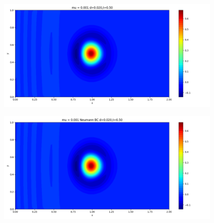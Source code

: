 \documentclass[12pt]{article}
\begin{document}
\begin{figure}[H]
\begin{minipage}{\linewidth}
    \begin{minipage}{0.5\textwidth}
    \includegraphics[width=\linewidth]{figuresmu/mu3d0.020t0.50.png}
    \label{fig3}
    \end{minipage}\hfill
    \begin{minipage}{0.5\textwidth}
    \includegraphics[width=\linewidth]{figuresmu/mu3Nud0.020t0.50.png}
    \label{fig4}
    \end{minipage}
    \vspace{-1.5em}
    

\end{minipage}
\end{figure}
\end{document}
